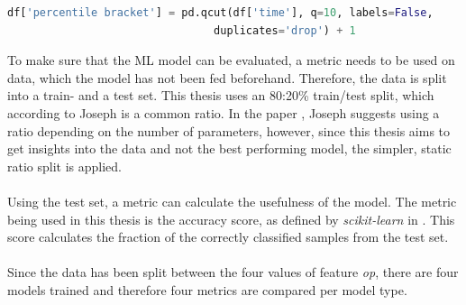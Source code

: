 \begin{lstlisting}[language=Python]
df['percentile bracket'] = pd.qcut(df['time'], q=10, labels=False,
                                duplicates='drop') + 1
\end{lstlisting}
To make sure that the \ac{ML} model can be evaluated, a metric needs to be used on data, which the model has not been fed beforehand. Therefore, the data is split into a train- and a test set. This thesis uses an 80:20\% train/test split, which according to Joseph \parencite{joseph2022optimal} is a common ratio. In the paper \parencite{joseph2022optimal}, Joseph suggests using a ratio depending on the number of parameters, however, since this thesis aims to get insights into the data and not the best performing model, the simpler, static ratio split is applied.\\\\
Using the test set, a metric can calculate the usefulness of the model. The metric being used in this thesis is the accuracy score, as defined by \textit{scikit-learn} in \parencite{sklearnm19:online}. This score calculates the fraction of the correctly classified samples from the test set.
\\\\
Since the data has been split between the four values of feature \textit{op}, there are four models trained and therefore four metrics are compared per model type. 


